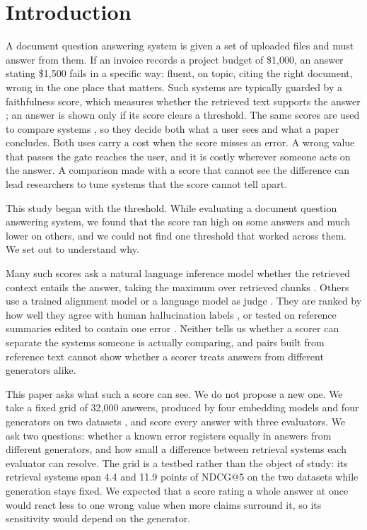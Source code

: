 \documentclass[11pt]{article}
\begin{document}
\section{Introduction}
\label{sec:intro}

A document question answering system is given a set of uploaded files and must answer from them. If an invoice records a project budget of \$1,000, an answer stating \$1,500 fails in a specific way: fluent, on topic, citing the right document, wrong in the one place that matters. Such systems are typically guarded by a faithfulness score, which measures whether the retrieved text supports the answer \citep{maynez-etal-2020}; an answer is shown only if its score clears a threshold. The same scores are used to compare systems \citep{es-etal-2024,tamber-etal-2025}, so they decide both what a user sees and what a paper concludes. Both uses carry a cost when the score misses an error. A wrong value that passes the gate reaches the user, and it is costly wherever someone acts on the answer. A comparison made with a score that cannot see the difference can lead researchers to tune systems that the score cannot tell apart.

This study began with the threshold. While evaluating a document question answering system, we found that the score ran high on some answers and much lower on others, and we could not find one threshold that worked across them. We set out to understand why.

Many such scores ask a natural language inference model whether the retrieved context entails the answer, taking the maximum over retrieved chunks \citep[e.g.][]{laban-etal-2022-summac}. Others use a trained alignment model \citep[AlignScore;][]{zha-etal-2023} or a language model as judge \citep{saad-falcon-etal-2024,tamber-etal-2025}. They are ranked by how well they agree with human hallucination labels \citep{honovich-etal-2022,tang-etal-2023,niu-etal-2024,bao-etal-2025}, or tested on reference summaries edited to contain one error \citep{ma-etal-2023}. Neither tells us whether a scorer can separate the systems someone is actually comparing, and pairs built from reference text cannot show whether a scorer treats answers from different generators alike.

This paper asks what such a score can see. We do not propose a new one. We take a fixed grid of 32,000 answers, produced by four embedding models and four generators on two datasets \citep{kwiatkowski-etal-2019,yang-etal-2018}, and score every answer with three evaluators. We ask two questions: whether a known error registers equally in answers from different generators, and how small a difference between retrieval systems each evaluator can resolve. The grid is a testbed rather than the object of study: its retrieval systems span 4.4 and 11.9 points of NDCG@5 \citep{jarvelin-kekalainen-2002} on the two datasets while generation stays fixed. We expected that a score rating a whole answer at once would react less to one wrong value when more claims surround it, so its sensitivity would depend on the generator.
\end{document}
